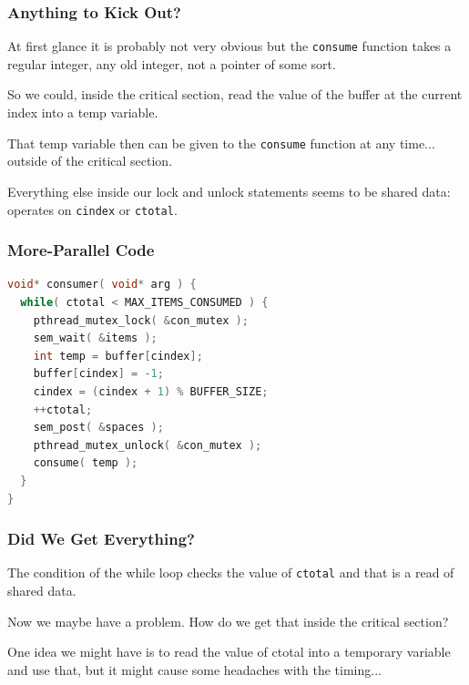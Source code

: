 \begin{frame}
\frametitle{Anything to Kick Out?}

At first glance it is probably not very obvious but the \texttt{consume} function takes a regular integer, any old integer, not a pointer of some sort. 

So we could, inside the critical section, read the value of the buffer at the current index into a temp variable. 

That temp variable then can be given to the \texttt{consume} function at any time... outside of the critical section. 

Everything else inside our lock and unlock statements seems to be shared data: operates on \texttt{cindex} or \texttt{ctotal}.


\end{frame}


\begin{frame}[fragile]
\frametitle{More-Parallel Code}

\begin{lstlisting}[language=C]
void* consumer( void* arg ) { 
  while( ctotal < MAX_ITEMS_CONSUMED ) {
    pthread_mutex_lock( &con_mutex );
    sem_wait( &items );
    int temp = buffer[cindex];
    buffer[cindex] = -1;
    cindex = (cindex + 1) % BUFFER_SIZE;
    ++ctotal;
    sem_post( &spaces );
    pthread_mutex_unlock( &con_mutex );
    consume( temp );
  }
}
\end{lstlisting}


\end{frame}


\begin{frame}
\frametitle{Did We Get Everything?}

The condition of the while loop checks the value of \texttt{ctotal} and that is a read of shared data. 

Now we maybe have a problem. How do we get that inside the critical section?

One idea we might have is to read the value of ctotal into a temporary variable and use that, but it might cause some headaches with the timing...


\end{frame}

